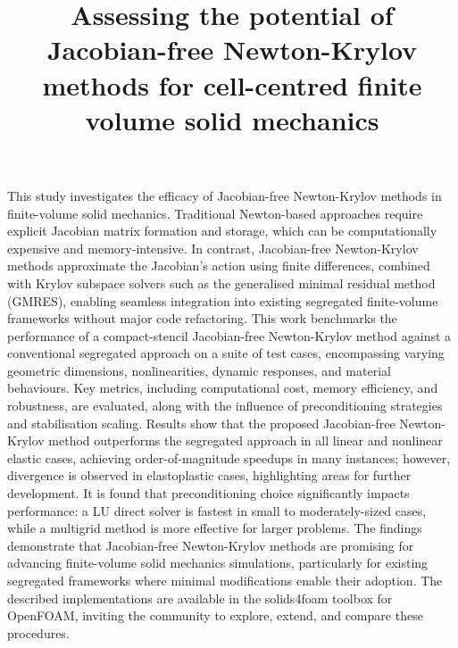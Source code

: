 \documentclass[sn-mathphys,Numbered]{sn-jnl}%
\begin{document}
\title[Article Title]{Assessing the potential of Jacobian-free Newton-Krylov methods for cell-centred finite volume solid mechanics}

\author*[1,2,3]{ }
\author[1,2,3]{ }
\author[4]{ }
\author[4]{ }




\abstract
{
This study investigates the efficacy of Jacobian-free Newton-Krylov methods in finite-volume solid mechanics. Traditional Newton-based approaches require explicit Jacobian matrix formation and storage, which can be computationally expensive and memory-intensive.
In contrast, Jacobian-free Newton-Krylov methods approximate the Jacobian’s action using finite differences, combined with Krylov subspace solvers such as the generalised minimal residual method (GMRES), enabling seamless integration into existing segregated finite-volume frameworks without major code refactoring.
This work benchmarks the performance of a compact-stencil Jacobian-free Newton-Krylov method against a conventional segregated approach on a suite of test cases, encompassing varying geometric dimensions, nonlinearities, dynamic responses, and material behaviours.
Key metrics, including computational cost, memory efficiency, and robustness, are evaluated, along with the influence of preconditioning strategies and stabilisation scaling.
Results show that the proposed Jacobian-free Newton-Krylov method outperforms the segregated approach in all linear and nonlinear elastic cases, achieving order-of-magnitude speedups in many instances; however, divergence is observed in elastoplastic cases, highlighting areas for further development.
It is found that preconditioning choice significantly impacts performance: a LU direct solver is fastest in small to moderately-sized cases, while a multigrid method is more effective for larger problems.
The findings demonstrate that Jacobian-free Newton-Krylov methods are promising for advancing finite-volume solid mechanics simulations, particularly for existing segregated frameworks where minimal modifications enable their adoption.
The described implementations are available in the solids4foam toolbox for OpenFOAM, inviting the community to explore, extend, and compare these procedures.
}
\end{document}
